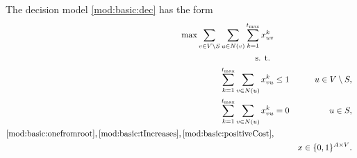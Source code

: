 The decision model \ref{mod:basic:dec}  has the form
\begin{subequations}\label{mod:basic:dec}
\begin{align}
\label{mod:basic:dec:obj} \max \sum\limits_{v \in V\setminus S}\sum\limits_{u \in N(v)} \sum\limits_{k=1}^{t_{\text{max}}}x_{uv}^k \\ 
\notag \text{s. t. } \\
\label{mod:basic:dec:atMost1in} \sum\limits_{k=1}^{t_{\text{max}}}\sum\limits_{v\in N(u)}x_{vu}^k & \leq 1 & u\in V \setminus S,\\
\label{mod:basic:dec:0toSource} \sum\limits_{k=1}^{t_{\text{max}}}\sum\limits_{v\in N(u)}x_{vu}^k & = 0  & u\in S,\\
\notag \eqref{mod:basic:onefromroot}, \eqref{mod:basic:tIncreases}, \eqref{mod:basic:positiveCost},\\
\label{mod:basic:dec:dim}&&x \in \{0,1\}^{A\times V}.
\end{align}~
\end{subequations}

